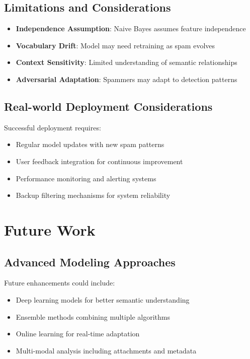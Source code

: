 \documentclass[12pt,a4paper]{article}
\begin{document}
\subsection{Limitations and Considerations}

\begin{itemize}
    \item \textbf{Independence Assumption}: Naive Bayes assumes feature independence
    \item \textbf{Vocabulary Drift}: Model may need retraining as spam evolves
    \item \textbf{Context Sensitivity}: Limited understanding of semantic relationships
    \item \textbf{Adversarial Adaptation}: Spammers may adapt to detection patterns
\end{itemize}

\subsection{Real-world Deployment Considerations}

Successful deployment requires:
\begin{itemize}
    \item Regular model updates with new spam patterns
    \item User feedback integration for continuous improvement
    \item Performance monitoring and alerting systems
    \item Backup filtering mechanisms for system reliability
\end{itemize}

\section{Future Work}

\subsection{Advanced Modeling Approaches}

Future enhancements could include:
\begin{itemize}
    \item Deep learning models for better semantic understanding
    \item Ensemble methods combining multiple algorithms
    \item Online learning for real-time adaptation
    \item Multi-modal analysis including attachments and metadata
\end{itemize}
\end{document}
